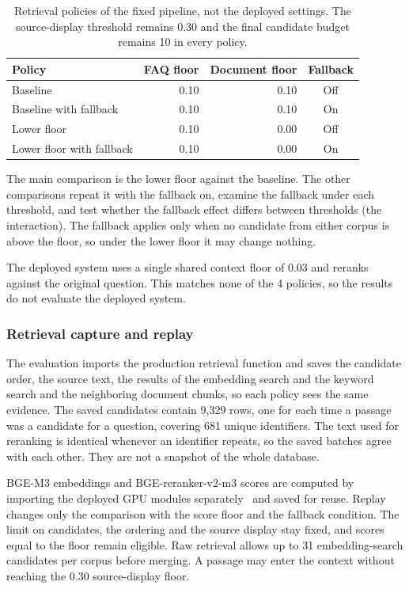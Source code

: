 \begin{table}[htbp]
\centering
\caption[Retrieval policies of the fixed pipeline, not the deployed settings]{Retrieval policies of the fixed pipeline, not the deployed settings. The source-display threshold remains 0.30 and the final candidate budget remains 10 in every policy.}
\label{tab:thesis-policies}
\begin{tabular}{lrrc}
\toprule
Policy & FAQ floor & Document floor & Fallback \\
\midrule
Baseline & 0.10 & 0.10 & Off \\
Baseline with fallback & 0.10 & 0.10 & On \\
Lower floor & 0.10 & 0.00 & Off \\
Lower floor with fallback & 0.10 & 0.00 & On \\
\bottomrule
\end{tabular}
\end{table}

The main comparison is the lower floor against the baseline. The other comparisons repeat it with the fallback on, examine the fallback under each threshold, and test whether the fallback effect differs between thresholds (the interaction). The fallback applies only when no candidate from either corpus is above the floor, so under the lower floor it may change nothing.

The deployed system uses a single shared context floor of 0.03 and reranks against the original question. This matches none of the 4 policies, so the results do not evaluate the deployed system.

\subsubsection{Retrieval capture and replay}

The evaluation imports the production retrieval function and saves the candidate order, the source text, the results of the embedding search and the keyword search and the neighboring document chunks, so each policy sees the same evidence. The saved candidates contain 9,329 rows, one for each time a passage was a candidate for a question, covering 681 unique identifiers. The text used for reranking is identical whenever an identifier repeats, so the saved batches agree with each other. They are not a snapshot of the whole database.

BGE-M3 embeddings and BGE-reranker-v2-m3 scores are computed by importing the deployed GPU modules separately~\cite{chen2024m3,baaiBgeRerankerV2M3} and saved for reuse. Replay changes only the comparison with the score floor and the fallback condition. The limit on candidates, the ordering and the source display stay fixed, and scores equal to the floor remain eligible. Raw retrieval allows up to 31 embedding-search candidates per corpus before merging. A passage may enter the context without reaching the 0.30 source-display floor.

